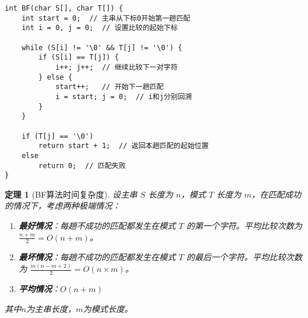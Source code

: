 \documentclass[12pt,a4paper]{amsart}
\newtheorem{theorem}{定理}[section]
\begin{document}
\begin{lstlisting}[caption=BF算法C++实现]
int BF(char S[], char T[]) {
    int start = 0;  // 主串从下标0开始第一趟匹配
    int i = 0, j = 0;  // 设置比较的起始下标
    
    while (S[i] != '\0' && T[j] != '\0') {
        if (S[i] == T[j]) {
            i++; j++;  // 继续比较下一对字符
        } else {
            start++;   // 开始下一趟匹配
            i = start; j = 0;  // i和j分别回溯
        }
    }
    
    if (T[j] == '\0')
        return start + 1;  // 返回本趟匹配的起始位置
    else
        return 0;  // 匹配失败
}
\end{lstlisting}

\begin{theorem}[BF算法时间复杂度]
设主串 $S$ 长度为 $n$，模式 $T$ 长度为 $m$，在匹配成功的情况下，考虑两种极端情况：
\begin{enumerate}
\item \textbf{最好情况}：每趟不成功的匹配都发生在模式 $T$ 的第一个字符。平均比较次数为 $\frac{n+m}{2} = O(n+m)$。
\item \textbf{最坏情况}：每趟不成功的匹配都发生在模式 $T$ 的最后一个字符。平均比较次数为 $\frac{m(n-m+2)}{2} = O(n \times m)$。
\item \textbf{平均情况}：$O(n+m)$
\end{enumerate}
其中$n$为主串长度，$m$为模式长度。
\end{theorem}
\end{document}
